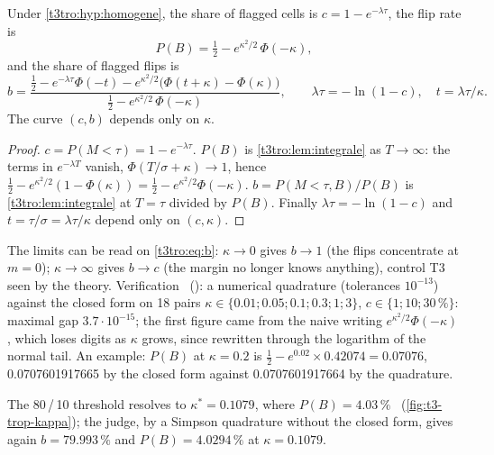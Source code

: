 \begin{theoreme}\label{t3tro:thm:garde}
Under \cref{t3tro:hyp:homogene}, the share of flagged cells is $c = 1 - e^{-\lambda\tau}$, the flip rate is
\begin{equation}\label{t3tro:eq:pb}
P(B) = \tfrac12 - e^{\kappa^2/2}\,\Phi(-\kappa),
\end{equation}
and the share of flagged flips is
\begin{equation}\label{t3tro:eq:b}
b = \frac{\tfrac12 - e^{-\lambda\tau}\Phi(-t) - e^{\kappa^2/2}\bigl(\Phi(t + \kappa) - \Phi(\kappa)\bigr)}{\tfrac12 - e^{\kappa^2/2}\,\Phi(-\kappa)}, \qquad \lambda\tau = -\ln(1 - c),\quad t = \lambda\tau/\kappa .
\end{equation}
The curve $(c, b)$ depends only on $\kappa$.
\end{theoreme}
\begin{proof}
$c = P(M < \tau) = 1 - e^{-\lambda\tau}$. $P(B)$ is \cref{t3tro:lem:integrale} as $T \to \infty$: the terms in $e^{-\lambda T}$ vanish, $\Phi(T/\sigma + \kappa) \to 1$, hence $\tfrac12 - e^{\kappa^2/2}(1 - \Phi(\kappa)) = \tfrac12 - e^{\kappa^2/2}\Phi(-\kappa)$. $b = P(M < \tau, B)/P(B)$ is \cref{t3tro:lem:integrale} at $T = \tau$ divided by $P(B)$. Finally $\lambda\tau = -\ln(1 - c)$ and $t = \tau/\sigma = \lambda\tau/\kappa$ depend only on $(c, \kappa)$.
\end{proof}
The limits can be read on \eqref{t3tro:eq:b}: $\kappa \to 0$ gives $b \to 1$ (the flips concentrate at $m = 0$); $\kappa \to \infty$ gives $b \to c$ (the margin no longer knows anything), control T3 seen by the theory. Verification \calc~(): a numerical quadrature (tolerances $10^{-13}$) against the closed form on 18 pairs $\kappa \in \{0.01; 0.05; 0.1; 0.3; 1; 3\}$, $c \in \{1; 10; 30\,\%\}$: maximal gap  $3.7 \cdot 10^{-15}$; the first figure came from the naive writing $e^{\kappa^2/2}\Phi(-\kappa)$, which loses digits as $\kappa$ grows, since rewritten through the logarithm of the normal tail. An example: $P(B)$ at $\kappa = 0.2$ is $\tfrac12 - e^{0.02} \times 0.42074 = 0.07076$, 0.0707601917665 by the closed form against 0.0707601917664 by the quadrature.

The 80\,/\,10 threshold resolves to $\kappa^\ast = 0.1079$, where $P(B) = 4.03\,\%$ \calc~(\cref{fig:t3-trop-kappa}); the judge, by a Simpson quadrature without the closed form, gives again $b = 79.993\,\%$ and $P(B) = 4.0294\,\%$ at $\kappa = 0.1079$.

